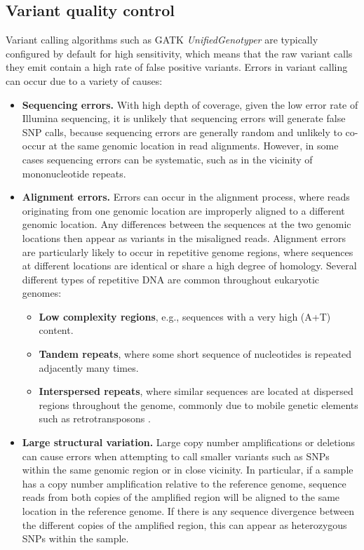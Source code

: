 \documentclass[a4paper,11pt,abstracton,hidelinks]{scrartcl}
\begin{document}
\subsection{Variant quality control}


Variant calling algorithms such as GATK \textit{UnifiedGenotyper} are typically configured by default for high sensitivity, which means that the raw variant calls they emit contain a high rate of false positive variants.
%
Errors in variant calling can occur due to a variety of causes:
\begin{itemize}
%
\item \textbf{Sequencing errors.} With high depth of coverage, given the low error rate of Illumina sequencing, it is unlikely that sequencing errors will generate false SNP calls, because sequencing errors are generally random and unlikely to co-occur at the same genomic location in read alignments. However, in some cases sequencing errors can be systematic, such as in the vicinity of mononucleotide repeats.
%
\item \textbf{Alignment errors.} Errors can occur in the alignment process, where reads originating from one genomic location are improperly aligned to a different genomic location. Any differences between the sequences at the two genomic locations then appear as variants in the misaligned reads. Alignment errors are particularly likely to occur in repetitive genome regions, where sequences at different locations are identical or share a high degree of homology. Several different types of repetitive DNA are common throughout eukaryotic genomes:
%
\begin{itemize}
%
\item \textbf{Low complexity regions}, e.g., sequences with a very high (A+T) content.
%
\item \textbf{Tandem repeats}, where some short sequence of nucleotides is repeated adjacently many times.
%
\item \textbf{Interspersed repeats}, where similar sequences are located at dispersed regions throughout the genome, commonly due to mobile genetic elements such as retrotransposons \citep{Tu2004,FernandezMedina2011}.
%
\end{itemize}
%
\item \textbf{Large structural variation.} Large copy number amplifications or deletions can cause errors when attempting to call smaller variants such as SNPs within the same genomic region or in close vicinity. In particular, if a sample has a copy number amplification relative to the reference genome, sequence reads from both copies of the amplified region will be aligned to the same location in the reference genome. If there is any sequence divergence between the different copies of the amplified region, this can appear as heterozygous SNPs within the sample.

\end{itemize}
\end{document}
